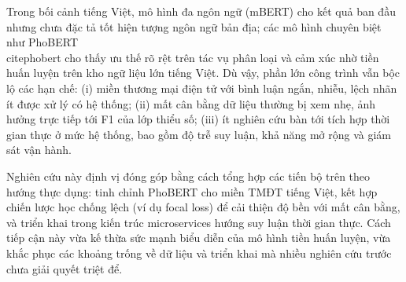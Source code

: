 Trong bối cảnh tiếng Việt, mô hình đa ngôn ngữ (mBERT) cho kết quả ban đầu nhưng chưa đặc tả tốt hiện tượng ngôn ngữ bản địa; các mô hình chuyên biệt như PhoBERT \\cite{phobert} cho thấy ưu thế rõ rệt trên tác vụ phân loại và cảm xúc nhờ tiền huấn luyện trên kho ngữ liệu lớn tiếng Việt. Dù vậy, phần lớn công trình vẫn bộc lộ các hạn chế: (i) miền thương mại điện tử với bình luận ngắn, nhiễu, lệch nhãn ít được xử lý có hệ thống; (ii) mất cân bằng dữ liệu thường bị xem nhẹ, ảnh hưởng trực tiếp tới F1 của lớp thiểu số; (iii) ít nghiên cứu bàn tới tích hợp thời gian thực ở mức hệ thống, bao gồm độ trễ suy luận, khả năng mở rộng và giám sát vận hành.

Nghiên cứu này định vị đóng góp bằng cách tổng hợp các tiến bộ trên theo hướng thực dụng: tinh chỉnh PhoBERT cho miền TMĐT tiếng Việt, kết hợp chiến lược học chống lệch (ví dụ focal loss) để cải thiện độ bền với mất cân bằng, và triển khai trong kiến trúc microservices hướng suy luận thời gian thực. Cách tiếp cận này vừa kế thừa sức mạnh biểu diễn của mô hình tiền huấn luyện, vừa khắc phục các khoảng trống về dữ liệu và triển khai mà nhiều nghiên cứu trước chưa giải quyết triệt để.

